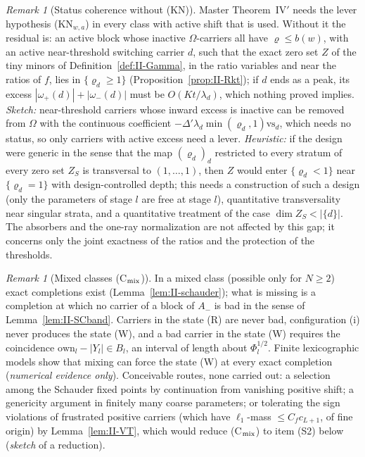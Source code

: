 \documentclass[10pt]{amsart}
\theoremstyle{definition}
\theoremstyle{remark}
\newtheorem{remark}[theorem]{Remark}
\begin{document}
\begin{remark}[Status coherence without (KN)]\label{rem:II-openKN}
Master Theorem~IV$'$ needs the lever hypothesis (KN$_{w,a}$) in every class with active
shift that is used.  Without it the residual is: an active block whose inactive
$\Omega$-carriers all have $\varrho\le b(w)$, with an active near-threshold switching carrier
$d$, such that the exact zero set $Z$ of the tiny minors of
Definition~\ref{def:II-Gamma}, in the ratio variables and near the ratios of $f$, lies in
$\{\varrho_d\ge1\}$ (Proposition~\ref{prop:II-Rkt}); if $d$ ends as a peak, its excess
$|\omega_+(d)|+|\omega_-(d)|$ must be $O(Kt/\lambda_d)$, which nothing proved implies.
\emph{Sketch:} near-threshold carriers whose inward excess is inactive can be removed
from $\Omega$ with the continuous coefficient $-\Delta'\lambda_d\min(\varrho_d,1)\mathrm{vs}_d$, which needs no
status, so only carriers with active excess need a lever.  \emph{Heuristic:} if the
design were generic in the sense that the map $(\varrho_d)_d$ restricted to every stratum
of every zero set $Z_S$ is transversal to $(1,\dots,1)$, then $Z$ would enter
$\{\varrho_d<1\}$ near $\{\varrho_d=1\}$ with design-controlled depth; this needs a construction
of such a design (only the parameters of stage $l$ are free at stage $l$), quantitative
transversality near singular strata, and a quantitative treatment of the case $\dim
Z_S<|\{d\}|$.  The absorbers and the one-ray normalization are not affected by this
gap; it concerns only the joint exactness of the ratios and the protection of the
thresholds.
\end{remark}

\begin{remark}[Mixed classes (C$_{\rm mix}$)]\label{rem:II-openmix}
In a mixed class (possible only for $N\ge2$) exact completions exist
(Lemma~\ref{lem:II-schauder}); what is missing is a completion at which no carrier of a
block of $A_-$ is bad in the sense of Lemma~\ref{lem:II-SCband}.  Carriers in the state
(R) are never bad, configuration (i) never produces the state (W), and a bad carrier
in the state (W) requires the coincidence $\mathrm{own}_l-|Y_l|\in B_l$, an interval of
length about $\Phi_l^{1/2}$.  Finite lexicographic models show that mixing can force the
state (W) at every exact completion (\emph{numerical evidence only}).  Conceivable
routes, none carried out: a selection among the Schauder fixed points by continuation
from vanishing positive shift; a genericity argument in finitely many coarse
parameters; or tolerating the sign violations of frustrated positive carriers (which
have $\ell_1$-mass $\le C_fc_{L+1}$, of fine origin) by
Lemma~\ref{lem:II-VT}, which would reduce (C$_{\rm mix}$) to item (S2) below
(\emph{sketch} of a reduction).
\end{remark}
\end{document}
